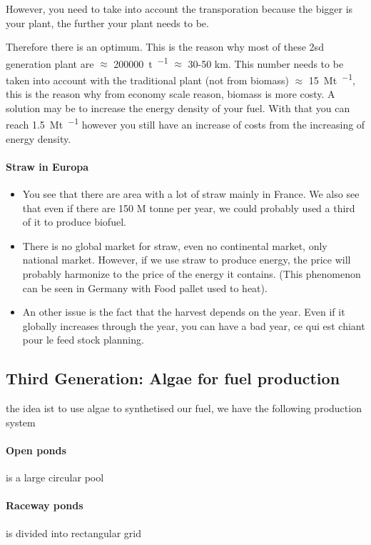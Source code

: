 \documentclass[10pt,a4paper]{article}
\begin{document}
However, you need to take into account the transporation because the bigger is your plant, the further your plant needs to be.

 Therefore there is an optimum. This is the reason why most of these 2sd generation plant are $\approx$ \SI{200000}{\tonne \per \year} $\approx$ 30-50 \si{\kilo \meter}. This number needs to be taken into account with the traditional plant (not from biomass) $\approx  $  \SI{15}{\mega\tonne \per \year}, this is the reason why from economy scale reason, biomass is more costy. A solution may be to increase the energy density of your fuel. With that you can reach \SI{1,5}{\mega\tonne \per \year} however you still have an increase of costs from the increasing of energy density.
 
 
 \paragraph{Straw in Europa}
 \begin{itemize}
 \item You see that there are area with a lot of straw mainly in France. We also see that even if there are 150 M tonne per year, we could probably used a third of it to produce biofuel.
 \item There is no global market for straw, even no continental market, only national market. However, if we use straw to produce energy, the price will probably harmonize to the price of the energy it contains. (This phenomenon can be seen in Germany with Food pallet used to heat).
 \item An other issue is the fact that the harvest depends on the year. Even if it globally increases through the year, you can have a bad year, ce qui est chiant pour le feed stock planning.
 \end{itemize}
 
 \subsection{Third Generation: Algae for fuel production} the idea ist to use algae to synthetised our fuel, we have the following production system
 \paragraph{Open ponds}is a large circular pool
 \paragraph{Raceway ponds}is divided into rectangular grid
\end{document}
